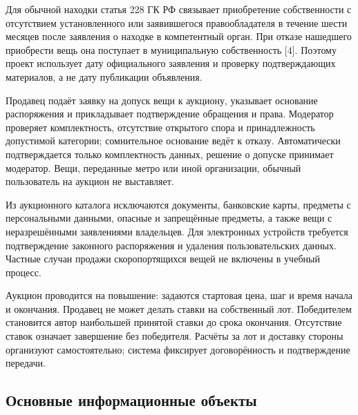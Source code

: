 Для обычной находки статья 228 ГК РФ связывает приобретение собственности с отсутствием установленного или заявившегося правообладателя в течение шести месяцев после заявления о находке в компетентный орган. При отказе нашедшего приобрести вещь она поступает в муниципальную собственность [4]. Поэтому проект использует дату официального заявления и проверку подтверждающих материалов, а не дату публикации объявления.

Продавец подаёт заявку на допуск вещи к аукциону, указывает основание распоряжения и прикладывает подтверждение обращения и права. Модератор проверяет комплектность, отсутствие открытого спора и принадлежность допустимой категории; сомнительное основание ведёт к отказу. Автоматически подтверждается только комплектность данных, решение о допуске принимает модератор. Вещи, переданные метро или иной организации, обычный пользователь на аукцион не выставляет.

Из аукционного каталога исключаются документы, банковские карты, предметы с персональными данными, опасные и запрещённые предметы, а также вещи с неразрешёнными заявлениями владельцев. Для электронных устройств требуется подтверждение законного распоряжения и удаления пользовательских данных. Частные случаи продажи скоропортящихся вещей не включены в учебный процесс.

Аукцион проводится на повышение: задаются стартовая цена, шаг и время начала и окончания. Продавец не может делать ставки на собственный лот. Победителем становится автор наибольшей принятой ставки до срока окончания. Отсутствие ставок означает завершение без победителя. Расчёты за лот и доставку стороны организуют самостоятельно; система фиксирует договорённость и подтверждение передачи.

\FloatBarrier
{}
\subsection{Основные информационные объекты}

